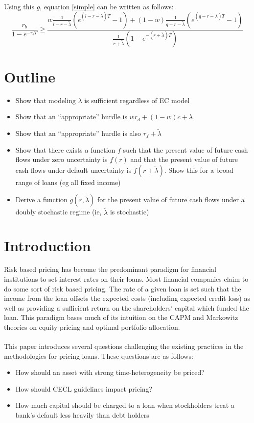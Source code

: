 \documentclass{article}
\begin{document}
Using this \(g\), equation \ref{simple} can be written as follows:
\[
\frac{ r_b}{1-e^{-r_b T}}  \geq 
\frac{w\frac{1}{l-r - \tilde{\lambda}}\left(e^{(l-r-\tilde{\lambda})T}-1\right)
+(1-w) \frac{1}{q-r - \tilde{\lambda}}\left(e^{(q-r-\tilde{\lambda})T}-1\right)}{\frac{1}{ r+ \tilde{\lambda}}\left(1-e^{-(r+\tilde{\lambda})T}\right)}
\]

\section{Outline}
\begin{itemize}
\item Show that modeling \(\lambda\) is sufficient regardless of EC model
\item Show that an ``appropriate'' hurdle is \(w r_d + (1-w)c+\lambda\)
\item Show that an ``appropriate'' hurdle is also \(r_f+\tilde{\lambda}\)
\item Show that there exists a function \(f\) such that the present value of future cash flows under zero uncertainty is \(f(r)\) and that the present value of future cash flows under default uncertainty is \(f(r+\tilde{\lambda})\).  Show this for a broad range of loans (eg all fixed income)
\item Derive a function \(g(r, \tilde{\lambda})\) for the present value of future cash flows under a doubly stochastic regime (ie, \(\tilde{\lambda}\) is stochastic)
\end{itemize}

\section{Introduction}
Risk based pricing has become the predominant paradigm for financial institutions to set interest rates on their loans.  Most financial companies claim to do some sort of risk based pricing.  The rate of a given loan is set such that the income from the loan offsets the expected costs (including expected credit loss) as well as providing a sufficient return on the shareholders' capital which funded the loan.  This paradigm bases much of its intuition on the CAPM and Markowitz theories on equity pricing and optimal portfolio allocation.  
\\
\\
This paper introduces several questions challenging the existing practices in the methodologies for pricing loans.  These questions are as follows:
\begin{itemize}
\item How should an asset with strong time-heterogeneity be priced?  
\item How should CECL guidelines impact pricing? 
\item How much capital should be charged to a loan when stockholders treat a bank's default less heavily than debt holders
\end{itemize}
\end{document}
